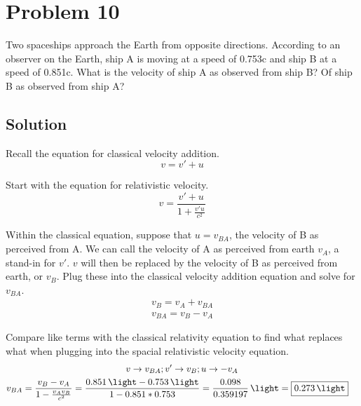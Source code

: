 \documentclass[12pt]{article}
\begin{document}
\section{Problem 10}
    Two spaceships approach the Earth from opposite directions.
    According to an observer on the Earth, ship A is moving at a speed of 0.753c and ship B at a speed of 0.851c. 
    What is the velocity of ship A as observed from ship B? 
    Of ship B as observed from ship A?
    
    \subsection{Solution}
        Recall the equation for classical velocity addition.
        \begin{equation}
            v = v' + u
        \end{equation}

        Start with the equation for relativistic velocity.
        \begin{equation}
            v = \frac{v' + u}{1 + \frac{v'u}{c^2}}
        \end{equation}

        Within the classical equation, suppose that $u = v_{BA}$, the velocity of B as perceived from A.
        We can call the velocity of A as perceived from earth $v_A$, a stand-in for $v'$.
        $v$ will then be replaced by the velocity of B as perceived from earth, or $v_B$.
        Plug these into the classical velocity addition equation and solve for $v_{BA}$.
        \begin{gather}
            v_B = v_A + v_{BA}\\
            v_{BA} = v_B - v_A
        \end{gather}

        Compare like terms with the classical relativity equation to find what replaces what when plugging into the spacial relativistic velocity equation.
        \begin{gather}
            v \to v_{BA};
            v' \to v_B;
            u \to -v_A\\
            \begin{align}
                v_{BA}  &=  \frac{v_B - v_A}{1 - \frac{v_A v_B}{c^2}}
                    =   \frac{0.851\,\unit{\light} - 0.753\,\unit{\light}}{1 - 0.851 * 0.753}
                    =   \frac{0.098}{0.359197}\,\unit{\light}
                    =   \boxed{0.273\,\unit{\light}}
            \end{align}
        \end{gather}
\end{document}
